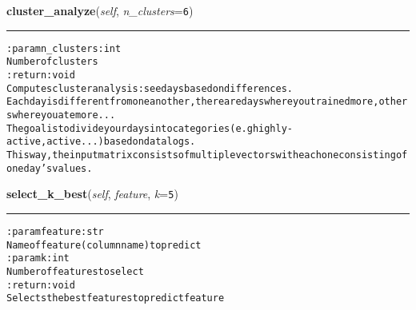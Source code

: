     \vspace{0.5ex}

\hspace{.8\funcindent}\begin{boxedminipage}{\funcwidth}

    \raggedright \textbf{cluster\_analyze}(\textit{self}, \textit{n\_clusters}={\tt 6})

    \vspace{-1.5ex}

    \rule{\textwidth}{0.5\fboxrule}
\setlength{\parskip}{2ex}
\begin{alltt}

:param n\_clusters: int
    Number of clusters
:return: void
    Computes cluster analysis: see days based on differences.
    Each day is different from one another, there are days where you trained more, others where you ate more ...
    The goal is to divide your days into categories (e.g highly-active, active ...) based on data logs.
    This way, the input matrix consists of multiple vectors with each one consisting of one day's values.
\end{alltt}

\setlength{\parskip}{1ex}
    \end{boxedminipage}

    \label{pygce:analysis:models:TimelineDataAnalysis:select_k_best}

    \vspace{0.5ex}

\hspace{.8\funcindent}\begin{boxedminipage}{\funcwidth}

    \raggedright \textbf{select\_k\_best}(\textit{self}, \textit{feature}, \textit{k}={\tt 5})

    \vspace{-1.5ex}

    \rule{\textwidth}{0.5\fboxrule}
\setlength{\parskip}{2ex}
\begin{alltt}

:param feature: str
    Name of feature (column name) to predict
:param k: int
    Number of features to select
:return: void
    Selects the best features to predict feature
\end{alltt}

\setlength{\parskip}{1ex}
    \end{boxedminipage}


